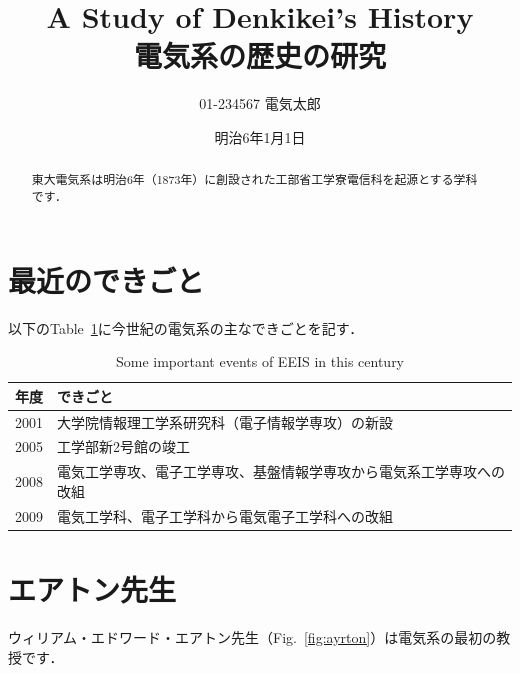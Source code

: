 \documentclass[uplatex,a4paper,dvipdfmx]{jsarticle} %
\begin{document}
\title{A Study of Denkikei's History\\電気系の歴史の研究}
\date{明治6年1月1日}
\author{01-234567 電気太郎}

\dendentitle

\begin{abstract}
  東大電気系は明治6年（1873年）に創設された工部省工学寮電信科を起源とする学科です．
\end{abstract}

\section{最近のできごと}

以下のTable~\ref{tab:history}に今世紀の電気系の主なできごとを記す．

\begin{table}[htbp]
  \centering
  \caption{Some important events of EEIS in this century}
  \label{tab:history}
  \begin{tabularx}{\linewidth}{r|X}
    年度 & できごと \\\hline
    2001 & 大学院情報理工学系研究科（電子情報学専攻）の新設 \\
    2005 & 工学部新2号館の竣工 \\
    2008 & 電気工学専攻、電子工学専攻、基盤情報学専攻から電気系工学専攻への改組\\
    2009 & 電気工学科、電子工学科から電気電子工学科への改組\\
  \end{tabularx}
\end{table}

\section{エアトン先生}

ウィリアム・エドワード・エアトン先生（Fig.~\ref{fig:ayrton}）は電気系の最初の教授です．
\end{document}
